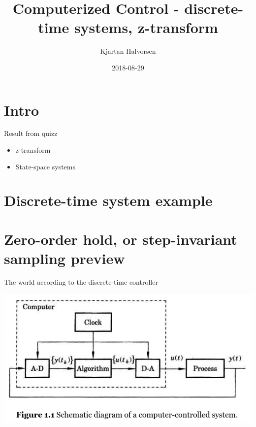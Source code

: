 \documentclass[presentation,aspectratio=169]{beamer}
\author{Kjartan Halvorsen}
\date{2018-08-29}
\title{Computerized Control - discrete-time systems, z-transform}
\begin{document}
\maketitle


\section{Intro}
\label{sec-1}


\begin{frame}[label=sec-1-1]{Result from quizz}
\begin{itemize}
\item z-transform
\item State-space systems
\end{itemize}
\end{frame}


\section{Discrete-time system example}
\label{sec-2}

\section{Zero-order hold, or step-invariant sampling preview}
\label{sec-3}

\begin{frame}[label=sec-3-1]{The world according to the discrete-time controller}
\begin{center}
\includegraphics[width=0.6\linewidth]{../../figures/fig1-1-schematic.png}
\end{center}
\end{frame}
\end{document}
